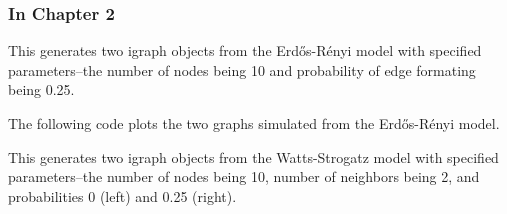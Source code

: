 \documentclass[12pt,twoside]{amherstthesis}
\begin{document}
  \subsubsection{In Chapter 2}\label{in-chapter-2}
  
  This generates two igraph objects from the Erdős-Rényi model with
  specified parameters--the number of nodes being 10 and probability of
  edge formating being 0.25.
  
  \begin{Shaded}
  \begin{Highlighting}[]
  \NormalTok{(}\NormalTok{)}
  
  \StringTok{ }\NormalTok{(} \NormalTok{, } \NormalTok{)}
  \StringTok{ }\NormalTok{(} \NormalTok{, } \NormalTok{)}
  \end{Highlighting}
  \end{Shaded}
  
  The following code plots the two graphs simulated from the Erdős-Rényi
  model.
  
  \begin{Shaded}
  \begin{Highlighting}[]
  \NormalTok{(}\NormalTok{(}\NormalTok{,}\NormalTok{))}
  \NormalTok{, } \NormalTok{)}
  \NormalTok{, } \NormalTok{)}
  \end{Highlighting}
  \end{Shaded}
  
  This generates two igraph objects from the Watts-Strogatz model with
  specified parameters--the number of nodes being 10, number of neighbors
  being 2, and probabilities 0 (left) and 0.25 (right).
  
\end{document}
